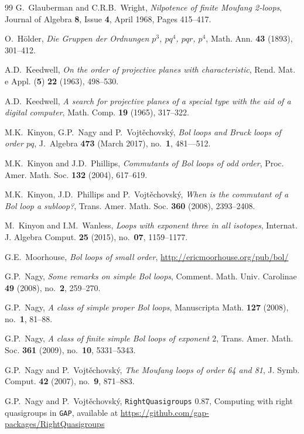 \documentclass[12pt,reqno]{amsart}
\numberwithin{equation}{section}
\theoremstyle{plain}
\theoremstyle{definition}
\begin{document}
\begin{thebibliography}{99}
G.~Glauberman and C.R.B.~Wright, \emph{Nilpotence of finite Moufang 2-loops}, Journal of Algebra \textbf{8}, Issue \textbf{4}, April 1968, Pages 415--417.

O.~H\"older, \emph{Die Gruppen der Ordnungen $p^3$, $pq^4$, $pqr$, $p^4$}, Math. Ann. \textbf{43} (1893), 301--412.

A.D.~Keedwell, \emph{On the order of projective planes with characteristic}, Rend. Mat. e Appl. (\textbf{5}) \textbf{22} (1963), 498--530.

A.D.~Keedwell, \emph{A search for projective planes of a special type with the aid of a digital computer}, Math. Comp. \textbf{19} (1965), 317--322.

M.K.~Kinyon, G.P.~Nagy and P.~Vojt\v{e}chovsk\'y, \emph{Bol loops and Bruck loops of order $pq$}, J.~Algebra \textbf{473} (March 2017), no.~\textbf{1}, 481---512.

M.K.~Kinyon and J.D.~Phillips, \emph{Commutants of Bol loops of odd order}, Proc. Amer. Math. Soc. \textbf{132} (2004), 617--619.

M.K.~Kinyon, J.D.~Phillips and P.~Vojt\v{e}chovsk\'{y}, \emph{When is the commutant of a Bol loop a subloop?}, Trans. Amer. Math. Soc. \textbf{360} (2008), 2393--2408.

M.~Kinyon and I.M.~Wanless, \emph{Loops with exponent three in all isotopes}, Internat. J. Algebra Comput. \textbf{25} (2015), no.~\textbf{07}, 1159--1177.

G.E.~Moorhouse, \emph{Bol loops of small order}, \url{http://ericmoorhouse.org/pub/bol/}

G.P.~Nagy, \emph{Some remarks on simple Bol loops}, Comment. Math. Univ. Carolinae \textbf{49} (2008), no.~\textbf{2}, 259--270.

G.P.~Nagy, \emph{A class of simple proper Bol loops}, Manuscripta Math. \textbf{127} (2008), no.~\textbf{1}, 81--88.

G.P.~Nagy, \emph{A class of finite simple Bol loops of exponent $2$}, Trans. Amer. Math. Soc. \textbf{361} (2009), no.~\textbf{10}, 5331--5343.

G.P.~Nagy and P.~Vojt\v{e}chovsk\'y, \emph{The Moufang loops of order 64 and 81}, J. Symb. Comput. \textbf{42} (2007), no.~\textbf{9}, 871--883.

G.P.~Nagy and P.~Vojt\v{e}chovsk\'y, \texttt{RightQuasigroups} 0.87, Computing with right quasigroups in \texttt{GAP}, available at \url{https://github.com/gap-packages/RightQuasigroups}


\end{thebibliography}
\end{document}

